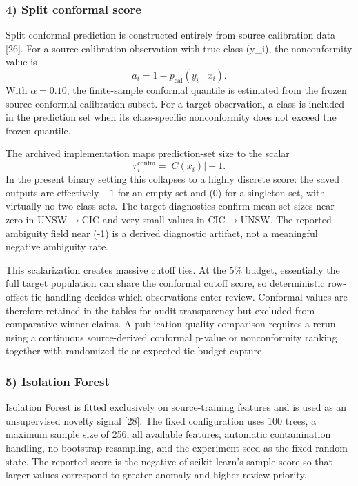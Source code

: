 \documentclass[conference]{IEEEtran}
\begin{document}
\subsubsection{4) Split conformal score}

Split conformal prediction is constructed entirely from source calibration data [26]. For a source calibration observation with true class (y_i), the nonconformity value is
\[
a_i = 1-p_{\mathrm{cal}}(y_i\mid x_i).
\]
With \(\alpha=0.10\), the finite-sample conformal quantile is estimated from the frozen source conformal-calibration subset. For a target observation, a class is included in the prediction set when its class-specific nonconformity does not exceed the frozen quantile.

The archived implementation maps prediction-set size to the scalar
\[
r_i^{\mathrm{confm}}=|C(x_i)|-1.
\]
In the present binary setting this collapses to a highly discrete score: the saved outputs are effectively \(-1\) for an empty set and (0) for a singleton set, with virtually no two-class sets. The target diagnostics confirm mean set sizes near zero in UNSW$\rightarrow$CIC and very small values in CIC$\rightarrow$UNSW. The reported ambiguity field near (-1) is a derived diagnostic artifact, not a meaningful negative ambiguity rate.

This scalarization creates massive cutoff ties. At the 5\% budget, essentially the full target population can share the conformal cutoff score, so deterministic row-offset tie handling decides which observations enter review. Conformal values are therefore retained in the tables for audit transparency but excluded from comparative winner claims. A publication-quality comparison requires a rerun using a continuous source-derived conformal p-value or nonconformity ranking together with randomized-tie or expected-tie budget capture.

\subsubsection{5) Isolation Forest}

Isolation Forest is fitted exclusively on source-training features and is used as an unsupervised novelty signal [28]. The fixed configuration uses 100 trees, a maximum sample size of 256, all available features, automatic contamination handling, no bootstrap resampling, and the experiment seed as the fixed random state. The reported score is the negative of scikit-learn's sample score so that larger values correspond to greater anomaly and higher review priority.
\end{document}
